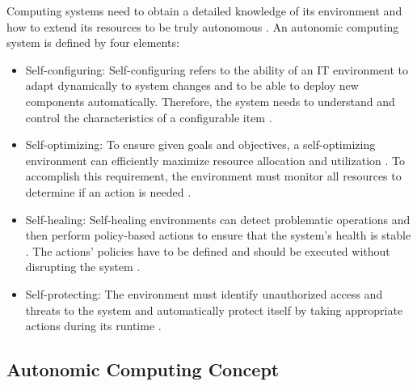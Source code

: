 Computing systems need to obtain a detailed knowledge of its environment and how to extend its resources to be truly autonomous \cite{Murch2004Autonomic}.
An autonomic computing system is defined by four elements:
\begin{itemize}
\item Self-configuring:
Self-configuring refers to the ability of an IT environment to adapt dynamically to system changes and to be able to deploy new components automatically. Therefore, the system needs to understand and control the characteristics of a configurable item \cite{Murch2004Autonomic, Sinreich2006AnAB}.

\item Self-optimizing:
To ensure given goals and objectives, a self-optimizing environment can efficiently maximize resource allocation and utilization \cite{Jacob2004AutonomicSolution}. To accomplish this requirement, the environment must monitor all resources to determine if an action is needed \cite{Murch2004Autonomic}.

\item Self-healing:
Self-healing environments can detect problematic operations and then perform policy-based actions to ensure that the system's health is stable \cite{Sinreich2006AnAB, Jacob2004AutonomicSolution}. The actions' policies have to be defined and should be executed without disrupting the system \cite{Sinreich2006AnAB, Jacob2004AutonomicSolution}.

\item Self-protecting:
The environment must identify unauthorized access and threats to the system and automatically protect itself by taking appropriate actions during its runtime \cite{Sinreich2006AnAB, Jacob2004AutonomicSolution}.
\end{itemize}


\subsection{Autonomic Computing Concept}

